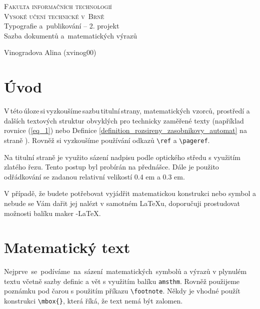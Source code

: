 \documentclass[11pt,a4paper,twocolumn]{article}
\theoremstyle{definition}
\begin{document}
	
\begin{titlepage}
		
	\begin{center}
		{\Huge\textsc{Fakulta informačních technologií \\ Vysoké učení technické v~Brně}}
		{\LARGE \\ Typografie a~publikování -- 2. projekt \\ Sazba dokumentů a~matematických výrazů}
	\end{center}

	{\Large\the\year\hfill Vinogradova Alina (xvinog00)}
		
\end{titlepage}
	
\section*{Úvod}
   
    V\,této\,úloze\,si\,vyzkoušíme\,sazbu\,titulní\,strany, matematických vzorců, prostředí a dalších textových struktur obvyklých pro technicky zaměřené texty (například rovnice (\ref{eq_1}) nebo Definice \ref{definition_rozsireny_zasobnikovy_automat} na straně \pageref{definition_rozsireny_zasobnikovy_automat}). Rovněž si vyzkoušíme používání odkazů \verb|\ref| a \verb|\pageref|.

    Na titulní straně je využito sázení nadpisu podle optického středu s využitím zlatého řezu. Tento postup byl probírán na přednášce. Dále je použito odřádkování se
    zadanou relativní velikostí 0.4 em a 0.3 em.

    V případě, že budete potřebovat vyjádřit matematickou
    konstrukci nebo symbol a nebude se Vám dařit jej nalézt
    v samotném \LaTeX u, doporučuji prostudovat možnosti balíku maker \AmS-\LaTeX.

\section{Matematický text}

    Nejprve \,se \,podíváme \,na \,sázení \,matematických \,symbolů
    a výrazů v plynulém textu včetně sazby definic a vět s využitím balíku \verb|amsthm|. Rovněž použijeme poznámku pod
    čarou s použitím příkazu \verb|\footnote|. Někdy je vhodné
    použít konstrukci \verb|\mbox{}|, která říká, že text nemá být
    zalomen.
\end{document}
